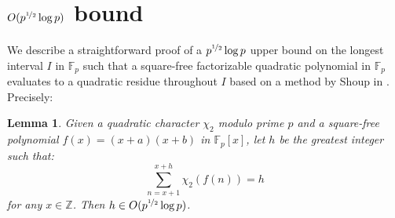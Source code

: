\documentclass{report}
\newtheorem*{lemma*}{Lemma}
\begin{document}
\section{$O(p^{\nicefrac{1}{2}}\log p)$ bound}
%
We describe a straightforward proof of a $p^{\nicefrac{1}{2}}\log p$ upper bound on the longest interval $I$ in $\mathbb{F}_p$ such that a square-free factorizable quadratic polynomial in $\mathbb{F}_p$ evaluates to a quadratic residue throughout $I$ based on a method by Shoup in \cite{shoup}. Precisely:
\begin{lemma*}
Given a quadratic character $\chi_2$ modulo prime $p$ and a square-free polynomial $f(x)=(x+a)(x+b)$ in $\mathbb{F}_p[x]$, let $h$ be the greatest integer such that:
\[\sum\limits_{n=x+1}^{x+h}\chi_2(f(n))=h\]
 for any $x\in\mathbb{Z}$. Then $h \in O(p^{\nicefrac{1}{2}}\log p)$.
\end{lemma*}
\end{document}
